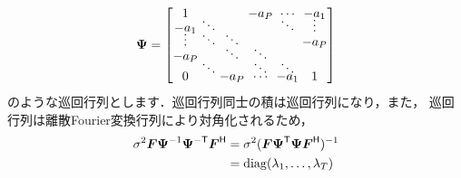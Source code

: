 \begin{align}
\Vec{\Psi} = 
\begin{bmatrix}
\hspace{-0ex}1& & &\hspace{-1.7ex}-a_P&\hspace{-1.7ex}\cdots&\hspace{-1.7ex}-a_1\vspace{-1.7ex}\\
\hspace{-0ex}-a_1&\hspace{-1.7ex}\ddots& & &\hspace{-1.7ex}\ddots&\hspace{-1.7ex}\vdots\vspace{-1.7ex}\\
\hspace{-0ex}\vdots&\hspace{-1.7ex}\ddots&\hspace{-1.7ex}\ddots& & &\hspace{-1.7ex}-a_P\vspace{-1.7ex}\\
\hspace{-0ex}-a_P& &\hspace{-1.7ex}\ddots &\hspace{-1.7ex}\ddots& &\vspace{-1.7ex}\\
 &\hspace{-1.7ex}\ddots& &\hspace{-1.7ex}\ddots&\hspace{-1.7ex}\ddots&\vspace{-1.7ex}\\
\hspace{-0ex}0 & &\hspace{-1.7ex}-a_P&\hspace{-1.7ex}\cdots&\hspace{-1.7ex}-a_1&\hspace{-1.7ex}1
\end{bmatrix}
\label{eq:Psi2}
\end{align}
のような巡回行列とします．巡回行列同士の積は巡回行列になり，また，
巡回行列は離散Fourier変換行列により対角化されるため，
\begin{align}
\sigma^2
\Vec{F}\Vec{\Psi}^{-1}\Vec{\Psi}^{- \mathsf T}\Vec{F}^{\mathsf H}
&=\sigma^2(\Vec{F}\Vec{\Psi}^{\mathsf T}\Vec{\Psi} \Vec{F}^{\mathsf H})^{-1}
\nonumber\\
&= {\rm diag}(\lambda_1,\ldots,\lambda_T)
\label{eq:diagonalize}
\end{align}
